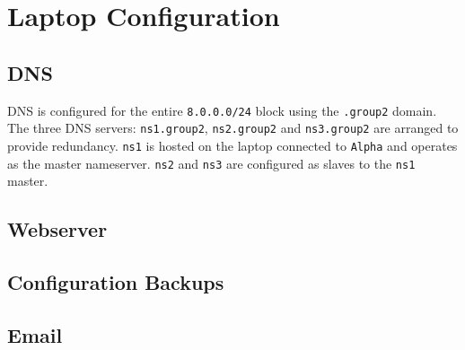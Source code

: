 \chapter{Laptop Configuration}
\section{DNS}
DNS is configured for the entire \texttt{8.0.0.0/24} block using the 
\texttt{.group2} domain. The three DNS servers: \texttt{ns1.group2}, \texttt
{ns2.group2} and \texttt{ns3.group2} are arranged to provide redundancy. \texttt
{ns1} is hosted on the laptop connected to \texttt{Alpha} and operates as the
master nameserver. \texttt{ns2} and \texttt{ns3} are configured as slaves to the
\texttt{ns1} master.
\section{Webserver}
\section{Configuration Backups}
\section{Email}